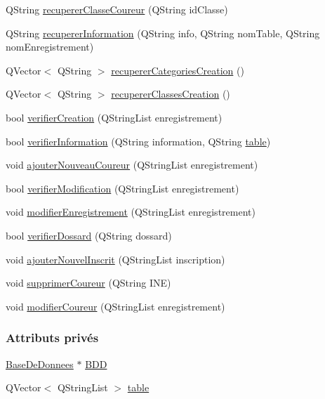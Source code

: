 \begin{DoxyCompactItemize}
Q\+String \hyperlink{class_gestion_b_d_d_a0e90b16b2e330de9cc80f72f0d648e5d}{recuperer\+Classe\+Coureur} (Q\+String id\+Classe)
\item 
Q\+String \hyperlink{class_gestion_b_d_d_a0a2fa02b90974684658937fbfb55bf0a}{recuperer\+Information} (Q\+String info, Q\+String nom\+Table, Q\+String nom\+Enregistrement)
\item 
Q\+Vector$<$ Q\+String $>$ \hyperlink{class_gestion_b_d_d_a76ab3e307ad9005dcdb2781fc77fc5c8}{recuperer\+Categories\+Creation} ()
\item 
Q\+Vector$<$ Q\+String $>$ \hyperlink{class_gestion_b_d_d_a38d728d644f23048f1a6d3e6d4656764}{recuperer\+Classes\+Creation} ()
\item 
bool \hyperlink{class_gestion_b_d_d_af6a83eb058d71d9c583c403bf5a8ce3b}{verifier\+Creation} (Q\+String\+List enregistrement)
\item 
bool \hyperlink{class_gestion_b_d_d_abfd3cfb9553a83aafd86c3149869d6c0}{verifier\+Information} (Q\+String information, Q\+String \hyperlink{class_gestion_b_d_d_afa3e974fb5afa7f25f275a662e182960}{table})
\item 
void \hyperlink{class_gestion_b_d_d_ae71561eea6d1163ff067f079ccc6d169}{ajouter\+Nouveau\+Coureur} (Q\+String\+List enregistrement)
\item 
bool \hyperlink{class_gestion_b_d_d_a5ea332563e5be2116084ed2886c355c8}{verifier\+Modification} (Q\+String\+List enregistrement)
\item 
void \hyperlink{class_gestion_b_d_d_af64457de89c484bf854db0910bef790e}{modifier\+Enregistrement} (Q\+String\+List enregistrement)
\item 
bool \hyperlink{class_gestion_b_d_d_a1a39bbc7bfcb60d286363b9d2dd7f88b}{verifier\+Dossard} (Q\+String dossard)
\item 
void \hyperlink{class_gestion_b_d_d_a71391d5419969b52cd999463b5326599}{ajouter\+Nouvel\+Inscrit} (Q\+String\+List inscription)
\item 
void \hyperlink{class_gestion_b_d_d_afe47ec92274b7998131c5d4e6551d177}{supprimer\+Coureur} (Q\+String I\+NE)
\item 
void \hyperlink{class_gestion_b_d_d_afad096d7e405d35a818d4858ee34df61}{modifier\+Coureur} (Q\+String\+List enregistrement)
\end{DoxyCompactItemize}
\subsubsection*{Attributs privés}
\begin{DoxyCompactItemize}
\item 
\hyperlink{class_base_de_donnees}{Base\+De\+Donnees} $\ast$ \hyperlink{class_gestion_b_d_d_a1bd17cbf5754eb6e54ae351f1d02dca2}{B\+DD}
\item 
Q\+Vector$<$ Q\+String\+List $>$ \hyperlink{class_gestion_b_d_d_afa3e974fb5afa7f25f275a662e182960}{table}
\end{DoxyCompactItemize}


